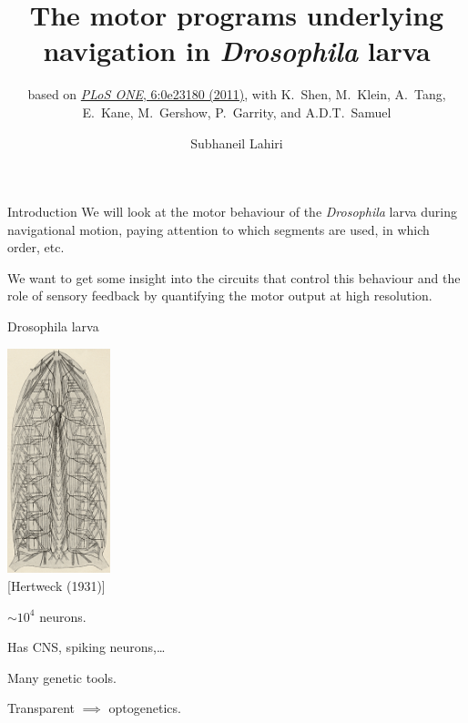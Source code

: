 \documentclass{beamer}%
\title[Motor programs in Drosophila larvae]{The motor programs underlying navigation in \emph{Drosophila} larva}
\subtitle{\small{based on \href{http://dx.doi.org/10.1371/journal.pone.0023180}{\emph{PLoS
  ONE}, 6:\penalty0e23180 (2011)},
  with  K.~Shen, M.~Klein, A.~Tang, E.~Kane, M.~Gershow, P.~Garrity, and A.D.T.~Samuel}\nocite{Lahiri2011}}
\author{Subhaneil Lahiri%
}
\institute[Harvard]{%
Harvard University
}
\newcommand{\rref}[1]{\hfill {\small{\color{darkgrey} [#1]}}}
\begin{document}

\begin{frame}
%
 \titlepage
%
\end{frame}


\begin{frame}{Introduction}
%
 We will look at the motor behaviour of the \emph{Drosophila} larva during navigational motion, paying attention to which segments are used, in which order, etc.

 \vp We want to get some insight into the circuits that control this behaviour and the role of sensory feedback by quantifying the motor output at high resolution.

%
\end{frame}



\begin{frame}{Drosophila larva}
%
 \parbox{5cm}{
   \includegraphics[width=3cm]{Figs/HertweckNervousSys.png}\\
   \rref{Hertweck (1931)}
 }
 \parbox{6cm}{
   $\sim10^4$ neurons.

   \vp Has CNS, spiking neurons,\ldots{}

   \vp Many genetic tools.

   \vp Transparent $\implies$ optogenetics.
 }
%
\end{frame}

%
%
%
%
\end{document}
